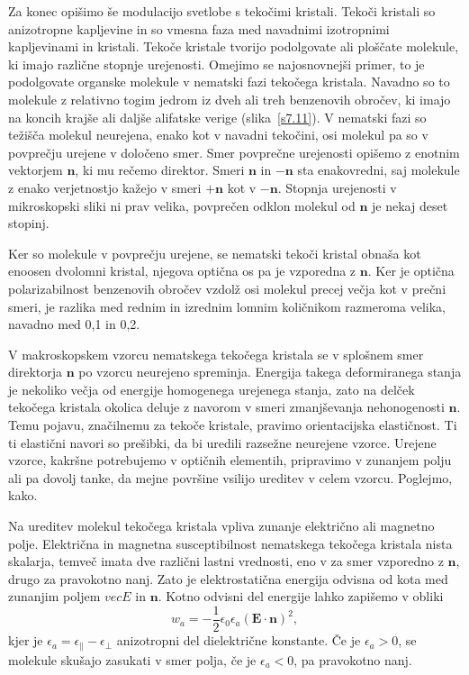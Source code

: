 Za konec opišimo še modulacijo svetlobe s tekočimi kristali. 
Tekoči kristali so anizotropne kapljevine in so vmesna faza med navadnimi
izotropnimi kapljevinami in kristali. Tekoče kristale tvorijo podolgovate ali 
ploščate molekule, ki imajo različne stopnje urejenosti. Omejimo se najosnovnejši
primer, to je podolgovate organske molekule v nematski fazi tekočega kristala. 
Navadno so to molekule z relativno togim jedrom iz
dveh ali treh benzenovih obročev, ki imajo na koncih krajše ali daljše
alifatske verige (slika~\ref{s7.11}). V nematski fazi so težišča molekul neurejena, 
enako kot v navadni tekočini, osi molekul pa so v povprečju urejene v določeno smer. 
Smer povprečne urejenosti opišemo z enotnim vektorjem $\mathbf{n}$, ki mu rečemo direktor. 
Smeri $\mathbf{n}$ in $-\mathbf{n}$ sta enakovredni, saj molekule
z enako verjetnostjo kažejo v smeri $+\mathbf{n}$ kot v $-\mathbf{n}$.
Stopnja urejenosti v mikroskopski sliki ni prav velika, povprečen
odklon molekul od $\mathbf{n}$ je nekaj deset stopinj.

Ker so molekule v povprečju urejene, se nematski tekoči kristal obnaša kot enoosen 
dvolomni kristal, njegova optična os pa je vzporedna z $\mathbf{n}$. 
Ker je optična polarizabilnost benzenovih obročev vzdolž osi molekul precej večja kot
v prečni smeri, je razlika med rednim in izrednim lomnim količnikom razmeroma velika, navadno med
0,1 in 0,2.

V makroskopskem vzorcu nematskega tekočega kristala se v splošnem smer
direktorja $\mathbf{n}$ po vzorcu neurejeno spreminja. Energija takega deformiranega 
stanja je nekoliko večja od energije homogenega urejenega stanja,
zato na delček tekočega kristala okolica deluje z navorom v smeri zmanjševanja 
nehonogenosti $\mathbf{n}$. Temu pojavu, značilnemu za tekoče kristale,
pravimo orientacijska elastičnost. Ti ti elastični navori so prešibki,
da bi uredili razsežne neurejene vzorce. Urejene vzorce, kakršne potrebujemo
v optičnih elementih, pripravimo v zunanjem polju ali pa dovolj tanke, da mejne 
površine vsilijo ureditev v celem vzorcu. Poglejmo, kako.

Na ureditev molekul tekočega kristala vpliva zunanje električno ali magnetno polje.
Električna in magnetna susceptibilnost nematskega tekočega
kristala nista skalarja, temveč imata dve različni lastni vrednosti,
eno v za smer vzporedno z $\mathbf{n}$, drugo za pravokotno nanj. Zato je
elektrostatična energija odvisna od kota med zunanjim poljem $vec{E}$
in $\mathbf{n}$. Kotno odvisni del energije lahko zapišemo v obliki
\begin{equation}
w_{a}=-\frac{1}{2}\epsilon_{0}\epsilon_{a}(\mathbf{E}\cdot\mathbf{n})^{2},
\label{7.56}
\end{equation}
kjer je $\epsilon_{a}=\epsilon_{\parallel}-\epsilon_{\perp}$ anizotropni
del dielektrične konstante. Če je $\epsilon_{a}>0$, se molekule skušajo
zasukati v smer polja, če je $\epsilon_{a}<0$, pa pravokotno nanj.

